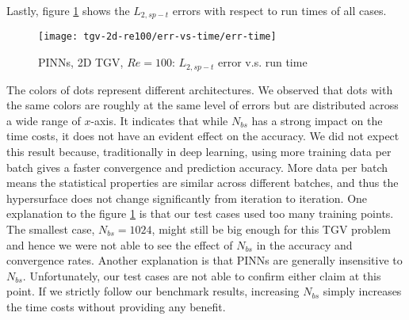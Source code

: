 Lastly, figure \ref{fig:tgv2d-re100-err-vs-time} shows the $L_{2,sp-t}$ errors with respect to run times of all cases.
\begin{figure}[hbt!]
    \centering%
    \texttt{[image: tgv-2d-re100/err-vs-time/err-time]}
    \caption[%
        PINNs, 2D TGV, $Re=100$: $L_{2,sp-t}$ error v.s. run time%
    ]{%
        PINNs, 2D TGV, $Re=100$: $L_{2,sp-t}$ error v.s. run time%
    }
    \label{fig:tgv2d-re100-err-vs-time}
\end{figure}
The colors of dots represent different architectures.
We observed that dots with the same colors are roughly at the same level of errors but are distributed across a wide range of $x$-axis.
It indicates that while $N_{bs}$ has a strong impact on the time costs, it does not have an evident effect on the accuracy.
We did not expect this result because, traditionally in deep learning, using more training data per batch gives a faster convergence and prediction accuracy.
More data per batch means the statistical properties are similar across different batches, and thus the hypersurface does not change significantly from iteration to iteration.
One explanation to the figure \ref{fig:tgv2d-re100-err-vs-time} is that our test cases used too many training points.
The smallest case, $N_{bs}=1024$, might still be big enough for this TGV problem and hence we were not able to see the effect of $N_{bs}$ in the accuracy and convergence rates.
Another explanation is that PINNs are generally insensitive to $N_{bs}$. 
Unfortunately, our test cases are not able to confirm either claim at this point.
If we strictly follow our benchmark results, increasing $N_{bs}$ simply increases the time costs without providing any benefit.
